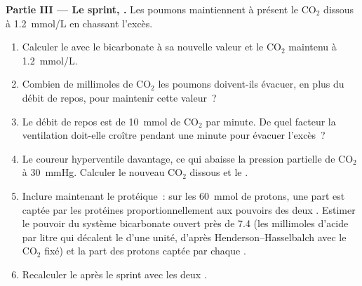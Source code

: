 \begin{problem}
\medskip
\noindent\textbf{Partie III --- Le sprint, .}
Les poumons maintiennent à présent le $\mathrm{CO_2}$ dissous à
\qty{1.2}{mmol/L} en chassant l'excès.
\begin{enumerate}[resume]
  \item Calculer le  avec le bicarbonate à sa nouvelle valeur et le
        $\mathrm{CO_2}$ maintenu à \qty{1.2}{mmol/L}.
  \item Combien de millimoles de $\mathrm{CO_2}$ les poumons doivent-ils
        évacuer, en plus du débit de repos, pour maintenir cette valeur~?
  \item Le débit de repos est de \qty{10}{mmol} de $\mathrm{CO_2}$ par
        minute. De quel facteur la ventilation doit-elle croître pendant
        une minute pour évacuer l'excès~?
  \item Le coureur hyperventile davantage, ce qui abaisse la pression
        partielle de $\mathrm{CO_2}$ à \qty{30}{mmHg}. Calculer le
        nouveau $\mathrm{CO_2}$ dissous et le .
  \item Inclure maintenant le  protéique~: sur les \qty{60}{mmol}
        de protons, une part est captée par les protéines
        proportionnellement aux pouvoirs des deux . Estimer le
        pouvoir du système bicarbonate ouvert près de  7.4 (les
        millimoles d'acide par litre qui décalent le  d'une unité,
        d'après Henderson--Hasselbalch avec le $\mathrm{CO_2}$ fixé) et
        la part des protons captée par chaque .
  \item Recalculer le  après le sprint avec les deux .
\end{enumerate}


\end{problem}

